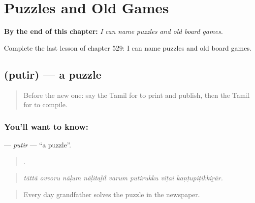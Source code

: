 
\chapter{Puzzles and Old Games}
\label{ch:ta-puzzles-and-old-games}

\begin{chapteropening}
\textbf{By the end of this chapter:} \emph{I can name puzzles and old board games.}

Complete the last lesson of chapter 529: I can name puzzles and old board games.
\end{chapteropening}

\section[\texorpdfstring{\ta{புதிர்} (putir)}{புதிர் (putir)}]{ (putir) — a puzzle}

\label{lesson:TA-C529-putir}



\begin{quote}
Before the new one: say the Tamil for to print and publish, then the Tamil for to compile.
\end{quote}

\subsection*{You'll want to know: }
\textbf{} — \emph{putir} — \textquotedblleft{}a puzzle\textquotedblright{}.

\begin{quote}
       .
\end{quote}

\begin{quote}
\emph{tāttā ovvoru nāḷum nāḷitaḻil varum putirukku viṭai kaṇṭupiṭikkiṟār.}
\end{quote}

\begin{quote}
Every day grandfather solves the puzzle in the newspaper.
\end{quote}

